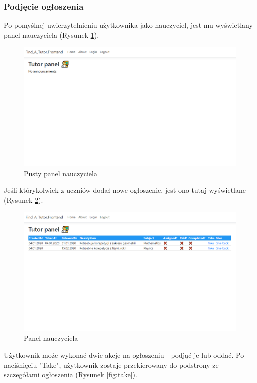 \documentclass[12pt]{article}
\numberwithin{figure}{section}
\begin{document}
\begin{sloppypar}
\subsubsection{Podjęcie ogłoszenia}
Po pomyślnej uwierzytelnieniu użytkownika jako nauczyciel, jest mu wyświetlany panel nauczyciela (Rysunek \ref{fig:tutor-empty}).
\begin{figure}[!htbp] 
    \centering
    \includegraphics[width=1\textwidth]{images/chapter_4/tutor-empty.png}
    \caption{Pusty panel nauczyciela}
    \label{fig:tutor-empty}
\end{figure}

Jeśli którykolwiek z uczniów dodał nowe ogłoszenie, jest ono tutaj wyświetlane (Rysunek \ref{fig:tutor}).
\begin{figure}[!htbp] 
    \centering
    \includegraphics[width=1\textwidth]{images/chapter_4/tutor.png}
    \caption{Panel nauczyciela}
    \label{fig:tutor}
\end{figure}
Użytkownik może wykonać dwie akcje na ogłoszeniu - podjąć je lub oddać. Po naciśnięciu "Take", użytkownik zostaje przekierowany do podstrony ze szczegółami ogłoszenia (Rysunek \ref{fig:take}).


\end{sloppypar}
\end{document}
